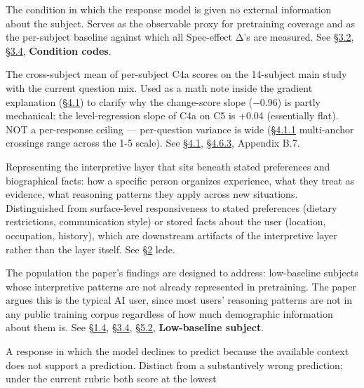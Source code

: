 \begin{description}
The condition in which the response model is given no external
information about the subject. Serves as the observable proxy for
pretraining coverage and as the per-subject baseline against which all
Spec-effect Δ's are measured. See \hyperref[experimental-conditions]{§3.2}, \hyperref[subjects]{§3.4}, \textbf{Condition codes}.
\item[Per-subject C4a mean (≈2.44)]
The cross-subject mean of per-subject C4a scores on the 14-subject main
study with the current question mix. Used as a math note inside the
gradient explanation (\hyperref[the-cross-subject-gradient-and-its-per-question-mechanism]{§4.1}) to clarify why the change-score slope
(−0.96) is partly mechanical: the level-regression slope of C4a on C5 is
+0.04 (essentially flat). NOT a per-response ceiling --- per-question
variance is wide (\hyperref[per-question-baseline-engagement-and-the-worked-rubric-example]{§4.1.1} multi-anchor crossings range across the 1-5
scale). See \hyperref[the-cross-subject-gradient-and-its-per-question-mechanism]{§4.1}, \hyperref[battery-composition-sensitivity]{§4.6.3}, Appendix B.7.
\item[Personalization (this paper's sense)]
Representing the interpretive layer that sits beneath stated preferences
and biographical facts: how a specific person organizes experience, what
they treat as evidence, what reasoning patterns they apply across new
situations. Distinguished from surface-level responsiveness to stated
preferences (dietary restrictions, communication style) or stored facts
about the user (location, occupation, history), which are downstream
artifacts of the interpretive layer rather than the layer itself. See \hyperref[prior-work-industry-benchmarks-the-fifth-target]{§2}
lede.
\item[Population of relevance]
The population the paper's findings are designed to address:
low-baseline subjects whose interpretive patterns are not already
represented in pretraining. The paper argues this is the typical AI
user, since most users' reasoning patterns are not in any public
training corpus regardless of how much demographic information about
them is. See \hyperref[what-this-implies]{§1.4}, \hyperref[subjects]{§3.4}, \hyperref[why-the-gradient-is-the-load-bearing-finding]{§5.2}, \textbf{Low-baseline subject}.
\item[Refusal (abstention)]
A response in which the model declines to predict because the available
context does not support a prediction. Distinct from a substantively
wrong prediction; under the current rubric both score at the lowest

\end{description}
